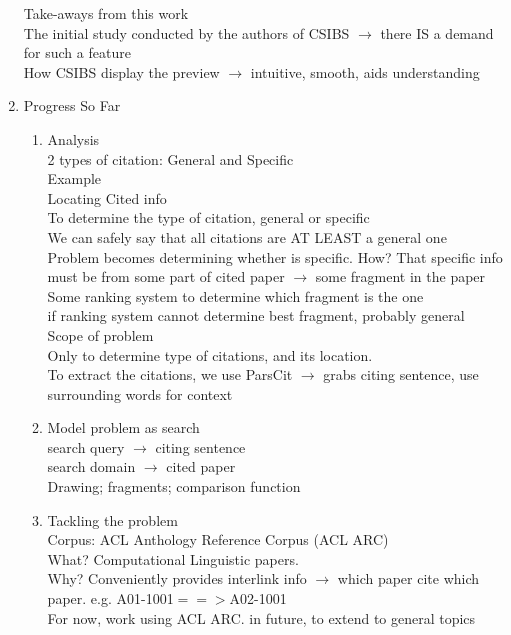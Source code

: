 \documentclass[12 pt]{article}
\begin{document}
\begin{enumerate}
Take-aways from this work\\
The initial study conducted by the authors of CSIBS $\rightarrow$ there IS a demand for such a feature\\
How CSIBS display the preview $\rightarrow$ intuitive, smooth, aids understanding
\item Progress So Far
\begin{enumerate}
\item Analysis\\
2 types of citation: General and Specific\\
Example\\
Locating Cited info\\
To determine the type of citation, general or specific\\
We can safely say that all citations are AT LEAST a general one\\
Problem becomes determining whether is specific. How? That specific info must be from some part of cited paper $\rightarrow$ some fragment in the paper\\
Some ranking system to determine which fragment is the one\\
if ranking system cannot determine best fragment, probably general
Scope of problem\\
Only to determine type of citations, and its location.\\
To extract the citations, we use ParsCit $\rightarrow$ grabs citing sentence, use surrounding words for context

\item Model problem as search\\
search query $\rightarrow$ citing sentence\\
search domain $\rightarrow$ cited paper\\
Drawing; fragments; comparison function

\item Tackling the problem\\
Corpus: ACL Anthology Reference Corpus (ACL ARC)\\
What? Computational Linguistic papers.\\
Why? Conveniently provides interlink info $\rightarrow$ which paper cite which paper. e.g. A01-1001$==>$A02-1001\\
For now, work using ACL ARC. in future, to extend to general topics


\end{enumerate}
\end{enumerate}
\end{document}
